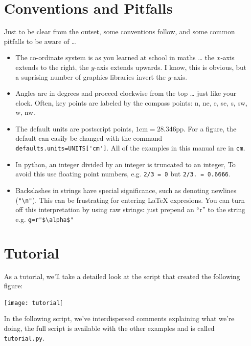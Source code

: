 \documentclass[a4paper]{book}
\begin{document}
\section{Conventions and Pitfalls}
\label{sec:conventions}

Just to be clear from the outset, some conventions follow, and some common
pitfalls to be aware of \ldots

\begin{itemize}
\item The co-ordinate system is as you learned at school in maths \ldots
  the $x$-axis extends to the right, the $y$-axis extends upwards. I know, 
  this is obvious, but a suprising number of graphics libraries invert the 
  $y$-axis.
\item Angles are in degrees and proceed clockwise from the top \ldots
  just like your clock.  Often, key points are labeled by the compass
  points: n, ne, e, se, s, sw, w, nw.
\item The default units are postscript points,
  $1\mathrm{cm}=28.346\mathrm{pp}$. For a figure, the default can
  easily be changed with the command
  \Verb|defaults.units=UNITS['cm']|. All of the examples in this manual are
  in \texttt{cm}.
\item In python, an integer divided by an integer is truncated to an
  integer, To avoid this use floating point numbers, e.g. \Verb|2/3 = 0|
  but \Verb|2/3. = 0.6666|.
\item Backslashes in strings have special significance, such as
  denoting newlines (\Verb|"\n"|). This can be frustrating for
  entering \LaTeX{} expresions. You can turn off this interpretation by
  using raw strings: just prepend an ``r'' to the string e.g.
  \Verb|g=r"$\alpha$"|
\end{itemize}


\section{Tutorial}
\label{sec:tutotial}

As a tutorial, we'll take a detailed look at the script that created the
following figure:
\begin{center}
  \texttt{[image: tutorial]}
\end{center}
In the following script, we've interdispersed 
comments explaining what we're doing, the full script is available
with the other examples and is called \texttt{tutorial.py}.
\end{document}
